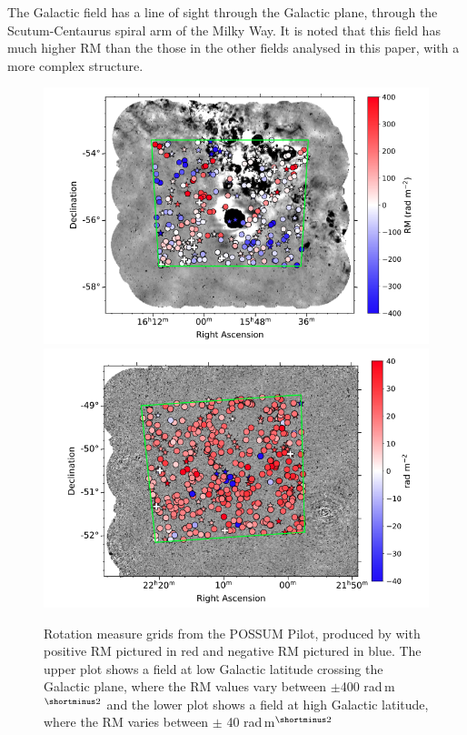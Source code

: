 The Galactic field has a line of sight through the Galactic plane, through the Scutum-Centaurus spiral arm of the Milky Way. It is noted that this field has much higher RM than the those in the other fields analysed in this paper, with a more complex structure.

\begin{figure}
    \centering
    \includegraphics[width=0.9\linewidth]{Thesis_Template/Figures/Shannon_GL.png}
    \includegraphics[width=0.9\linewidth]{Thesis_Template/Figures/Shannon_EC.png}
    \caption[Rotation measure grids form the POSSUM Pilot]{Rotation measure grids from the POSSUM Pilot, produced by \cite{vanderwoude2024prototypefaradayrotationmeasure} with positive RM pictured in red and negative RM pictured in blue. The upper plot shows a field at low Galactic latitude crossing the Galactic plane, where the RM values vary between $\pm$400 rad$\,$m$^{\shortminus2}$ and the lower plot shows a field at high Galactic latitude, where the RM varies between $\pm$ 40 rad$\,$m$^{\shortminus2}$}
    \label{fig: Shannon's RM grids}
\end{figure}

